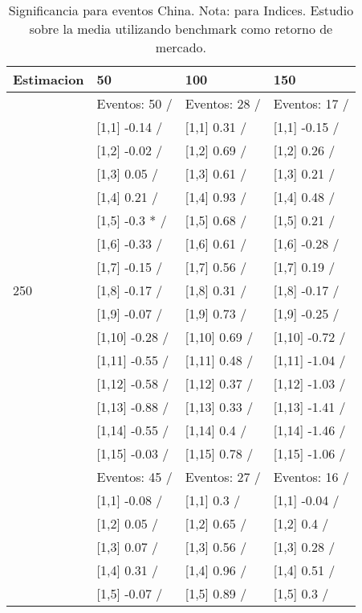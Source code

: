 \begin{table}

\caption{Significancia para eventos China. Nota: para Indices. Estudio sobre la media utilizando benchmark como retorno de mercado.}
\centering
\begin{tabular}[t]{llll}
\toprule
Estimacion & 50 & 100 & 150\\
\midrule
 & Eventos:  50 / & Eventos:  28 / & Eventos:  17 /\\
 & {}[1,1] -0.14  / & {}[1,1] 0.31  / & {}[1,1] -0.15  /\\
 & {}[1,2] -0.02  / & {}[1,2] 0.69  / & {}[1,2] 0.26  /\\
 & {}[1,3] 0.05  / & {}[1,3] 0.61  / & {}[1,3] 0.21  /\\
 & {}[1,4] 0.21  / & {}[1,4] 0.93  / & {}[1,4] 0.48  /\\
\addlinespace
 & {}[1,5] -0.3 * / & {}[1,5] 0.68  / & {}[1,5] 0.21  /\\
 & {}[1,6] -0.33  / & {}[1,6] 0.61  / & {}[1,6] -0.28  /\\
 & {}[1,7] -0.15  / & {}[1,7] 0.56  / & {}[1,7] 0.19  /\\
250 & {}[1,8] -0.17  / & {}[1,8] 0.31  / & {}[1,8] -0.17  /\\
 & {}[1,9] -0.07  / & {}[1,9] 0.73  / & {}[1,9] -0.25  /\\
\addlinespace
 & {}[1,10] -0.28  / & {}[1,10] 0.69  / & {}[1,10] -0.72  /\\
 & {}[1,11] -0.55  / & {}[1,11] 0.48  / & {}[1,11] -1.04  /\\
 & {}[1,12] -0.58  / & {}[1,12] 0.37  / & {}[1,12] -1.03  /\\
 & {}[1,13] -0.88  / & {}[1,13] 0.33  / & {}[1,13] -1.41  /\\
 & {}[1,14] -0.55  / & {}[1,14] 0.4  / & {}[1,14] -1.46  /\\
\addlinespace
 & {}[1,15] -0.03  / & {}[1,15] 0.78  / & {}[1,15] -1.06  /\\
 & Eventos:  45 / & Eventos:  27 / & Eventos:  16 /\\
 & {}[1,1] -0.08  / & {}[1,1] 0.3  / & {}[1,1] -0.04  /\\
 & {}[1,2] 0.05  / & {}[1,2] 0.65  / & {}[1,2] 0.4  /\\
 & {}[1,3] 0.07  / & {}[1,3] 0.56  / & {}[1,3] 0.28  /\\
\addlinespace
 & {}[1,4] 0.31  / & {}[1,4] 0.96  / & {}[1,4] 0.51  /\\
 & {}[1,5] -0.07  / & {}[1,5] 0.89  / & {}[1,5] 0.3  /\\

\end{tabular}
\end{table}
